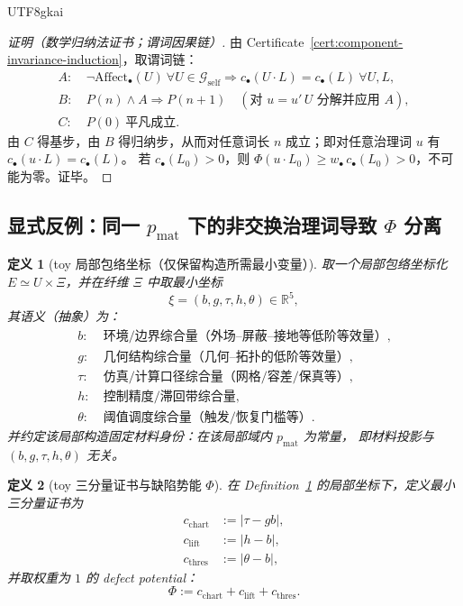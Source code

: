 \documentclass[12pt]{article}
\newtheorem{definition}{定义}[section]
\begin{document}
\begin{CJK*}{UTF8}{gkai}
\begin{proof}[证明（数学归纳法证书；谓词因果链）]
由 Certificate~\ref{cert:component-invariance-induction}，取谓词链：
\[
\begin{aligned}
A:&\ \neg\mathrm{Affect}_{\bullet}(U)\ \forall U\in\mathcal{G}_{\mathrm{self}}
\Rightarrow c_{\bullet}(U\cdot L)=c_{\bullet}(L)\ \forall U,L,\\
B:&\ P(n)\wedge A \Rightarrow P(n+1)\quad(\text{对 }u=u'\,U\text{ 分解并应用 }A),\\
C:&\ P(0)\ \text{平凡成立}.
\end{aligned}
\]
由 $C$ 得基步，由 $B$ 得归纳步，从而对任意词长 $n$ 成立；即对任意治理词 $u$ 有 $c_{\bullet}(u\cdot L)=c_{\bullet}(L)$。
若 $c_{\bullet}(L_0)>0$，则 $\Phi(u\cdot L_0)\ge w_{\bullet}\,c_{\bullet}(L_0)>0$，不可能为零。证毕。
\end{proof}

\subsection{显式反例：同一 $p_{\mathrm{mat}}$ 下的非交换治理词导致 $\Phi$ 分离}

\begin{definition}[toy 局部包络坐标（仅保留构造所需最小变量）]
\label{def:toy-envelope-variables}
取一个局部包络坐标化 $E\simeq U\times\Xi$，并在纤维 $\Xi$ 中取最小坐标
\[
\xi=(b,g,\tau,h,\theta)\in\mathbb{R}^5,
\]
其语义（抽象）为：
\[
\begin{aligned}
b:&\ \text{环境/边界综合量（外场--屏蔽--接地等低阶等效量）},\\
g:&\ \text{几何结构综合量（几何--拓扑的低阶等效量）},\\
\tau:&\ \text{仿真/计算口径综合量（网格/容差/保真等）},\\
h:&\ \text{控制精度/滞回带综合量},\\
\theta:&\ \text{阈值调度综合量（触发/恢复门槛等）}.
\end{aligned}
\]
并约定该局部构造固定材料身份：在该局部域内 $p_{\mathrm{mat}}$ 为常量，
即材料投影与 $(b,g,\tau,h,\theta)$ 无关。
\end{definition}

\begin{definition}[toy 三分量证书与缺陷势能 $\Phi$]
\label{def:toy-defect-potential}
在 Definition~\ref{def:toy-envelope-variables} 的局部坐标下，定义最小三分量证书为
\[
\begin{aligned}
c_{\mathrm{chart}}&:=|\tau-gb|,\\
c_{\mathrm{lift}}&:=|h-b|,\\
c_{\mathrm{thres}}&:=|\theta-b|,
\end{aligned}
\]
并取权重为 $1$ 的 defect potential：
\[
\Phi:=c_{\mathrm{chart}}+c_{\mathrm{lift}}+c_{\mathrm{thres}}.
\]
\end{definition}


\end{CJK*}
\end{document}
